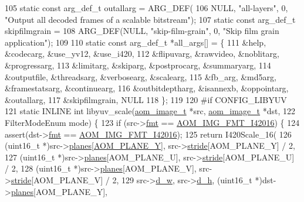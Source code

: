 \begin{DoxyCodeInclude}
105 \textcolor{keyword}{static} \textcolor{keyword}{const} arg\_def\_t outallarg = ARG\_DEF(
106     NULL, \textcolor{stringliteral}{"all-layers"}, 0, \textcolor{stringliteral}{"Output all decoded frames of a scalable bitstream"});
107 \textcolor{keyword}{static} \textcolor{keyword}{const} arg\_def\_t skipfilmgrain =
108     ARG\_DEF(NULL, \textcolor{stringliteral}{"skip-film-grain"}, 0, \textcolor{stringliteral}{"Skip film grain application"});
109 
110 \textcolor{keyword}{static} \textcolor{keyword}{const} arg\_def\_t *all\_args[] = \{
111   &help,           &codecarg,   &use\_yv12,      &use\_i420,
112   &flipuvarg,      &rawvideo,   &noblitarg,     &progressarg,
113   &limitarg,       &skiparg,    &postprocarg,   &summaryarg,
114   &outputfile,     &threadsarg, &verbosearg,    &scalearg,
115   &fb\_arg,         &md5arg,     &framestatsarg, &continuearg,
116   &outbitdeptharg, &isannexb,   &oppointarg,    &outallarg,
117   &skipfilmgrain,  NULL
118 \};
119 
120 \textcolor{preprocessor}{#if CONFIG\_LIBYUV}
121 \textcolor{keyword}{static} INLINE \textcolor{keywordtype}{int} libyuv\_scale(\hyperlink{structaom__image}{aom\_image\_t} *src, \hyperlink{structaom__image}{aom\_image\_t} *dst,
122                                FilterModeEnum mode) \{
123   \textcolor{keywordflow}{if} (src->\hyperlink{structaom__image_a6c64b1ab918d80d52eb8f5d6d957e825}{fmt} == \hyperlink{aom__image_8h_a930317c04b4bd0a660bb5e744055523ca20a9cf30277260685642b4cfb4e9273b}{AOM\_IMG\_FMT\_I42016}) \{
124     assert(dst->\hyperlink{structaom__image_a6c64b1ab918d80d52eb8f5d6d957e825}{fmt} == \hyperlink{aom__image_8h_a930317c04b4bd0a660bb5e744055523ca20a9cf30277260685642b4cfb4e9273b}{AOM\_IMG\_FMT\_I42016});
125     \textcolor{keywordflow}{return} I420Scale\_16(
126         (uint16\_t *)src->\hyperlink{structaom__image_ac54dbc5237ca2914f9ec30105dfbe302}{planes}[\hyperlink{aom__image_8h_a2ad22076006b15cf809edcaa33f6d339}{AOM\_PLANE\_Y}], src->\hyperlink{structaom__image_a6dc693d7dbc9eb06c0cdde307ca58372}{stride}[AOM\_PLANE\_Y] / 2,
127         (uint16\_t *)src->\hyperlink{structaom__image_ac54dbc5237ca2914f9ec30105dfbe302}{planes}[AOM\_PLANE\_U], src->\hyperlink{structaom__image_a6dc693d7dbc9eb06c0cdde307ca58372}{stride}[AOM\_PLANE\_U] / 2,
128         (uint16\_t *)src->\hyperlink{structaom__image_ac54dbc5237ca2914f9ec30105dfbe302}{planes}[AOM\_PLANE\_V], src->\hyperlink{structaom__image_a6dc693d7dbc9eb06c0cdde307ca58372}{stride}[AOM\_PLANE\_V] / 2,
129         src->\hyperlink{structaom__image_a89f80b1f58d608b9d2080635f4359034}{d\_w}, src->\hyperlink{structaom__image_ab986419a1f0fff93a2dc505f47194988}{d\_h}, (uint16\_t *)dst->\hyperlink{structaom__image_ac54dbc5237ca2914f9ec30105dfbe302}{planes}[AOM\_PLANE\_Y],

\end{DoxyCodeInclude}
